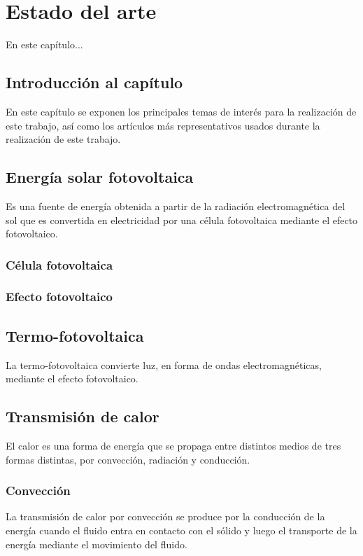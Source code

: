 \chapter{Estado del arte}


En este capítulo...
\cite{noauthor_parallel-plate_nodate}
\cite{doi:MicroGapTPV}
\cite{doi:Thermoionic_Campbell}
\cite{doi:Near-field_ThinFilm}

\section{Introducción al capítulo}
En este capítulo se exponen los principales temas de interés para la realización de este trabajo, así como los artículos más representativos usados durante la realización de este trabajo.
\section{Energía solar fotovoltaica}
Es una fuente de energía obtenida a partir de la radiación electromagnética del sol que es convertida en electricidad por una célula fotovoltaica mediante el efecto fotovoltaico.

\subsection{Célula fotovoltaica}

\subsection{Efecto fotovoltaico}



\section{Termo-fotovoltaica}
La termo-fotovoltaica convierte luz, en forma de ondas electromagnéticas, mediante el efecto fotovoltaico. 
\section{Transmisión de calor}
El calor es una forma de energía que se propaga entre distintos medios de tres formas distintas, por convección, radiación y conducción.
\subsection{Convección}
La transmisión de calor por convección se produce por la conducción de la energía cuando el fluido entra en contacto con el sólido y luego el transporte de la energía mediante el movimiento del fluido.
